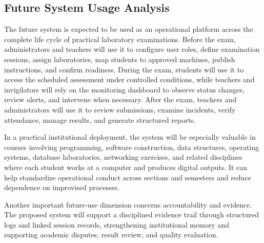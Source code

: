 \subsection{Future System Usage Analysis}
The future system is expected to be used as an operational platform across the complete life cycle of practical laboratory examinations. Before the exam, administrators and teachers will use it to configure user roles, define examination sessions, assign laboratories, map students to approved machines, publish instructions, and confirm readiness. During the exam, students will use it to access the scheduled assessment under controlled conditions, while teachers and invigilators will rely on the monitoring dashboard to observe status changes, review alerts, and intervene when necessary. After the exam, teachers and administrators will use it to review submissions, examine incidents, verify attendance, manage results, and generate structured reports.

In a practical institutional deployment, the system will be especially valuable in courses involving programming, software construction, data structures, operating systems, database laboratories, networking exercises, and related disciplines where each student works at a computer and produces digital outputs. It can help standardize operational conduct across sections and semesters and reduce dependence on improvised processes.

Another important future-use dimension concerns accountability and evidence. The proposed system will support a disciplined evidence trail through structured logs and linked session records, strengthening institutional memory and supporting academic disputes, result review, and quality evaluation.
